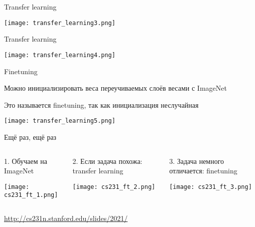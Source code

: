 \documentclass[notes,12pt, aspectratio=169]{beamer}
\newenvironment{wideitemize}{\itemize\addtolength{\itemsep}{10pt}}{\enditemize}
\begin{document}
\begin{frame}{Transfer learning}
\begin{center}
\texttt{[image: transfer\_learning3.png]}
\end{center}
\end{frame}


\begin{frame}{Transfer learning}
\begin{center}
\texttt{[image: transfer\_learning4.png]}
\end{center}
\end{frame}


\begin{frame}{Finetuning}
\begin{wideitemize}
	\item  Можно инициализировать веса переучиваемых слоёв весами с ImageNet
	\item  Это называется \alert{finetuning,} так как инициализация неслучайная
\end{wideitemize}
\begin{center}
	\texttt{[image: transfer\_learning5.png]}
\end{center}
\end{frame}


\begin{frame}{Ещё раз, ещё раз}
	\begin{columns}
	\begin{column}{0.33\textwidth}
		\alert{1. Обучаем на ImageNet}
		\begin{center}
			\texttt{[image: cs231\_ft\_1.png]}
		\end{center}
	\end{column}
	\hfill
	\begin{column}{0.33\textwidth}
		\alert{2. Если задача похожа: transfer learning}
		\begin{center}
			\texttt{[image: cs231\_ft\_2.png]}
		\end{center}
	\end{column}
	\hfill
	\begin{column}{0.33\textwidth}
		\alert{3. Задача немного отличается: finetuning}
		\begin{center}
			\texttt{[image: cs231\_ft\_3.png]}
		\end{center}
	\end{column}
\end{columns}
\vfill %
\footnotesize
{\color{blue}  \url{http://cs231n.stanford.edu/slides/2021/}}
\end{frame}
\end{document}
